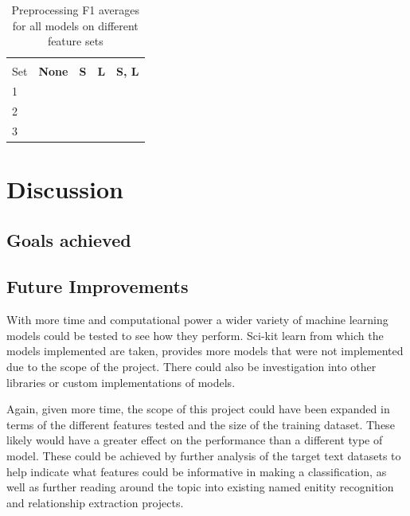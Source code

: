 \documentclass[11pt,oneside]{book}
\begin{document}
\begin{longtable}[c]{|l|l|l|l|l|}
\caption{Preprocessing F1 averages for all models on different feature sets}
\label{tab:ner_re_preprocessing}\\
\hline
\textbf{\begin{tabular}[c]{@{}l@{}}Feature \\ Set\end{tabular}} & \multicolumn{1}{c|}{\textbf{None}} & \multicolumn{1}{c|}{\textbf{S}} & \multicolumn{1}{c|}{\textbf{L}} & \multicolumn{1}{c|}{\textbf{S, L}} \\ \hline
\endfirsthead
%
\endhead
%
1                                                               & \multicolumn{1}{c|}{}              & \multicolumn{1}{c|}{}           &                                 &                                    \\ \hline
2                                                               &                                    &                                 &                                 &                                    \\ \hline
3                                                               &                                    &                                 &                                 &                                    \\ \hline
\end{longtable}

\chapter{Discussion}

\section{Goals achieved}


\section{Future Improvements}
With more time and computational power a wider variety of machine learning models could be tested to see how they perform. Sci-kit learn from which the models implemented are taken, provides more models that were not implemented due to the scope of the project. There could also be investigation into other libraries or custom implementations of models.

Again, given more time, the scope of this project could have been expanded in terms of the different features tested and the size of the training dataset. These likely would have a greater effect on the performance than a different type of model. These could be achieved by further analysis of the target text datasets to help indicate what features could be informative in making a classification, as well as further reading around the topic into existing named enitity recognition and relationship extraction projects.
\end{document}
